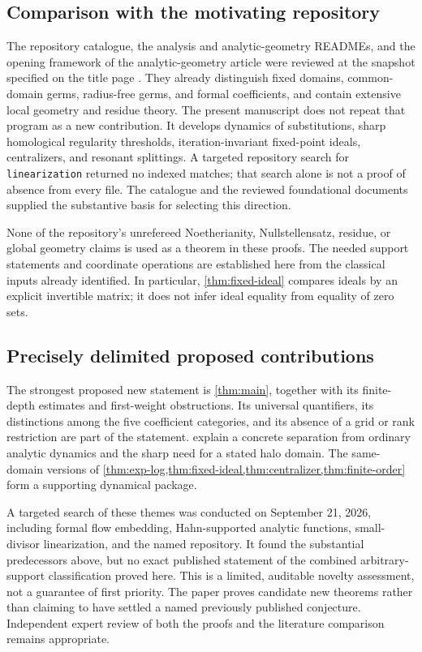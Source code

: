 \documentclass[11pt,letterpaper]{article}
\theoremstyle{definition}
\theoremstyle{remark}
\numberwithin{equation}{section}
\begin{document}
\subsection{Comparison with the motivating repository}
The repository catalogue, the analysis and analytic-geometry READMEs, and
the opening framework of the analytic-geometry article were reviewed at the
snapshot specified on the title page \cite{Repo}.
They already distinguish fixed domains, common-domain germs, radius-free
germs, and formal coefficients, and contain extensive local geometry and
residue theory. The present manuscript does not repeat that program as a
new contribution. It develops dynamics of substitutions, sharp homological
regularity thresholds, iteration-invariant fixed-point ideals, centralizers,
and resonant splittings. A targeted repository search for
\texttt{linearization} returned no indexed matches; that search alone is not
a proof of absence from every file. The catalogue and the reviewed
foundational documents supplied the substantive basis for selecting this
direction.

None of the repository's unrefereed Noetherianity, Nullstellensatz, residue,
or global geometry claims is used as a theorem in these proofs. The needed
support statements and coordinate operations are established here from the
classical inputs already identified. In particular,
\cref{thm:fixed-ideal} compares ideals by an explicit invertible matrix;
it does not infer ideal equality from equality of zero sets.

\subsection{Precisely delimited proposed contributions}
The strongest proposed new statement is \cref{thm:main}, together with its
finite-depth estimates and first-weight obstructions. Its universal
quantifiers, its distinctions among the five coefficient categories, and
its absence of a grid or rank restriction are part of the statement.
 explain a concrete separation from
ordinary analytic dynamics and the sharp need for a stated halo domain.
The same-domain versions of \cref{thm:exp-log,thm:fixed-ideal,thm:centralizer,thm:finite-order}
form a supporting dynamical package.

A targeted search of these themes was conducted on September 21, 2026,
including formal flow embedding, Hahn-supported analytic functions,
small-divisor linearization, and the named repository. It found the substantial
predecessors above, but no exact published statement of the combined
arbitrary-support classification proved here. This is a limited, auditable
novelty assessment, not a guarantee of first priority. The paper proves
candidate new theorems rather than claiming to have settled a named
previously published conjecture. Independent expert review of both the
proofs and the literature comparison remains appropriate.
\end{document}
